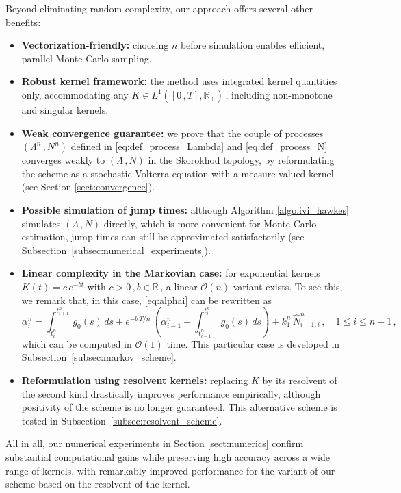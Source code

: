 \documentclass{article}
\newcommand{\R}{\mathbb{R}}
\newcommand{\1}{\mathbbm{1}}
\numberwithin{equation}{section}
\begin{document}
Beyond eliminating random complexity, our approach offers several other benefits:
\begin{itemize}
    \item[$\bullet$] \textbf{Vectorization-friendly:} choosing $n$ before simulation enables efficient, parallel Monte Carlo sampling.
    \item[$\bullet$] \textbf{Robust kernel framework:} the method uses integrated kernel quantities only, accommodating any $K \in L^1([0\,,T], \R_+)\,$, including non-monotone and singular kernels.
    \item[$\bullet$] \textbf{Weak convergence guarantee:} we prove that the couple of processes $\left(\Lambda^n\,,N^n\right)$ defined in \eqref{eq:def_process_Lambda} and \eqref{eq:def_process_N} converges weakly to $(\Lambda\,, N)$ in the Skorokhod topology, by reformulating the scheme as a stochastic Volterra equation with a measure-valued kernel (see Section \ref{sect:convergence}).
    \item[$\bullet$] \textbf{Possible simulation of jump times:} although Algorithm \ref{algo:ivi_hawkes} simulates $(\Lambda\,,N)$ directly, which is more convenient for Monte Carlo estimation, jump times can still be approximated satisfactorily (see Subsection~\ref{subsec:numerical_experiments}).
      \item[$\bullet$] \textbf{Linear complexity in the Markovian case:} for exponential kernels $K(t) = c\,e^{-b t}$ with $c > 0\,,b \in \R\,$, a linear $\mathcal O(n)$ variant exists. To see this, we remark that, in this case, \eqref{eq:alphai} can be rewritten as
    \begin{equation}
        \label{eq:Lambda_markov_case}
        \alpha^n_i = \int_{t^n_i}^{t^n_{i+1}}\,g_0(s)\,ds +  e^{-b\,T/n}\,\left(\alpha^n_{i-1} - \int_{t^n_{i-1}}^{t^n_i}\,g_0(s)\,ds \right) + k^n_1 \,\widehat N^n_{i-1,i} \,,\quad 1 \leq i \leq n-1\,,
    \end{equation}
    which can be computed in $\mathcal O(1)$ time. This particular case is developed in Subsection~\ref{subsec:markov_scheme}. 
    \item[$\bullet$] \textbf{Reformulation using resolvent kernels:} replacing $K$ by its resolvent of the second kind drastically improves performance empirically, although positivity of the scheme is no longer guaranteed. This alternative scheme is tested in Subsection~\ref{subsec:resolvent_scheme}.
\end{itemize}

All in all, our numerical experiments in  Section \ref{sect:numerics} confirm substantial computational gains while preserving high accuracy across a wide range of kernels, with remarkably improved performance for the variant of our scheme based on the resolvent of the kernel.
\end{document}
